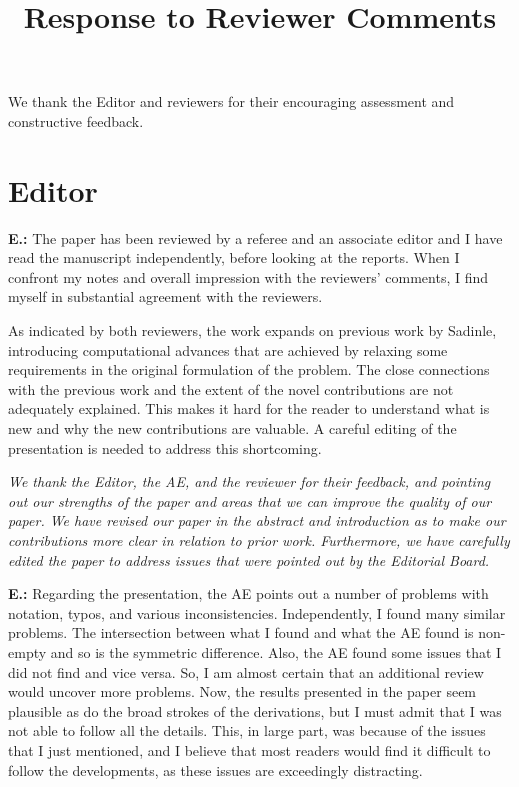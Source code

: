 \documentclass[letterpaper, parskip]{scrartcl}
\newcommand{\pointRaised}[2]{%
	\textbf{#1.\theresponsectr:} #2
}
\newcounter{responsectr}[section]     %
\newcommand{\reply}[1]{%
	\refstepcounter{responsectr}%
		\begin{tcolorbox}
			\itshape #1
		\end{tcolorbox}
}
\begin{document}

	\title{Response to Reviewer Comments}

	\maketitle
	We thank the Editor and reviewers for their encouraging assessment and constructive
	feedback.


	\section*{Editor}


	\pointRaised{E}{%
	The paper has been reviewed by a referee and an associate editor and I have read the manuscript independently, before looking at the reports.  When I confront my notes and overall impression with the reviewers’ comments, I find myself in substantial agreement with the reviewers.

	As indicated by both reviewers, the work expands on previous work by Sadinle, introducing computational advances that are achieved by relaxing some requirements in the original formulation of the problem.  The close connections with the previous work and the extent of the novel contributions are not adequately explained.  This makes it hard for the reader to understand what is new and why the new contributions are valuable.  A careful editing of the presentation is needed to address this shortcoming.}

	\reply{%
We thank the Editor, the AE, and the reviewer for their feedback, and pointing out our strengths of the paper and areas that we can improve the quality of our paper. We have revised our paper in the abstract and introduction as to make our contributions more clear in relation to prior work.  Furthermore, we have carefully edited the paper to address issues that were pointed out by the Editorial Board.
	}

	\newpage

	\pointRaised{E}{%
	Regarding the presentation, the AE points out a number of problems with notation, typos, and various inconsistencies.  Independently, I found many similar problems.  The intersection between what I found and what the AE found is non-empty and so is the symmetric difference.  Also, the AE found some issues that I did not find and vice versa.  So, I am almost certain that an additional review would uncover more problems.  Now, the results presented in the paper seem plausible as do the broad strokes of the derivations, but I must admit that I was not able to follow all the details. This, in large part, was because of the issues that I just mentioned, and I believe that most readers would find it difficult to follow the developments, as these issues are exceedingly distracting.
	}
	
\end{document}
